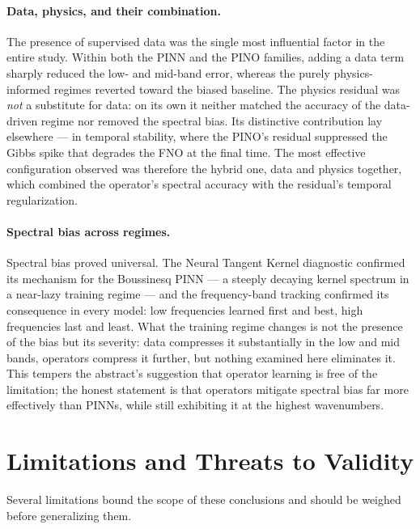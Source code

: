 \paragraph{Data, physics, and their combination.} The presence of supervised data was the single most influential factor in the entire study. Within both the PINN and the PINO families, adding a data term sharply reduced the low- and mid-band error, whereas the purely physics-informed regimes reverted toward the biased baseline. The physics residual was \emph{not} a substitute for data: on its own it neither matched the accuracy of the data-driven regime nor removed the spectral bias. Its distinctive contribution lay elsewhere --- in temporal stability, where the PINO's residual suppressed the Gibbs spike that degrades the FNO at the final time. The most effective configuration observed was therefore the hybrid one, data and physics together, which combined the operator's spectral accuracy with the residual's temporal regularization.

\paragraph{Spectral bias across regimes.} Spectral bias proved universal. The Neural Tangent Kernel diagnostic confirmed its mechanism for the Boussinesq PINN --- a steeply decaying kernel spectrum in a near-lazy training regime --- and the frequency-band tracking confirmed its consequence in every model: low frequencies learned first and best, high frequencies last and least. What the training regime changes is not the presence of the bias but its severity: data compresses it substantially in the low and mid bands, operators compress it further, but nothing examined here eliminates it. This tempers the abstract's suggestion that operator learning is free of the limitation; the honest statement is that operators mitigate spectral bias far more effectively than PINNs, while still exhibiting it at the highest wavenumbers.

\section{Limitations and Threats to Validity}

Several limitations bound the scope of these conclusions and should be weighed before generalizing them.

